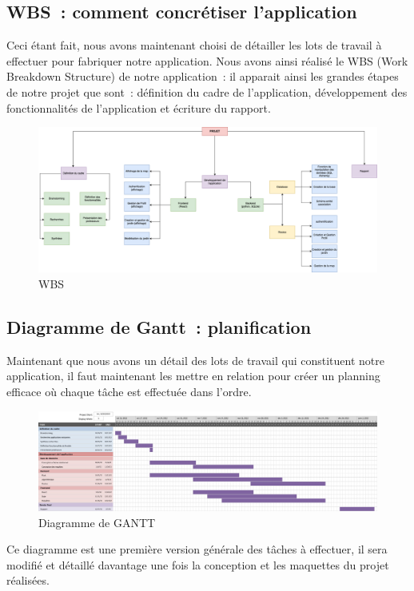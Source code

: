 \documentclass[french,a4paper]{article}
\begin{document}
\subsection{WBS~: comment concrétiser l’application}
Ceci étant fait, nous avons maintenant choisi de détailler les lots de travail à effectuer pour fabriquer notre application. Nous avons ainsi réalisé le WBS (Work Breakdown Structure) de notre application~: il apparait ainsi les grandes étapes de notre projet que sont~: définition du cadre de l’application, développement des fonctionnalités de l’application et écriture du rapport.
\begin{figure}[H]
    \centering
    \includegraphics[width=1\textwidth]{img/WBS.png}
    \caption{WBS}
\end{figure}

\subsection{Diagramme de Gantt~: planification}
Maintenant que nous avons un détail des lots de travail qui constituent notre application, il faut maintenant les mettre en relation pour créer un planning efficace où chaque tâche est effectuée dans l’ordre.
\begin{figure}[H]
    \centering
    \includegraphics[width=1\textwidth]{img/gantt.png}
    \caption{Diagramme de GANTT}
\end{figure}
Ce diagramme est une première version générale des tâches à effectuer, il sera modifié et détaillé davantage une fois la conception et les maquettes du projet réalisées.
\end{document}
